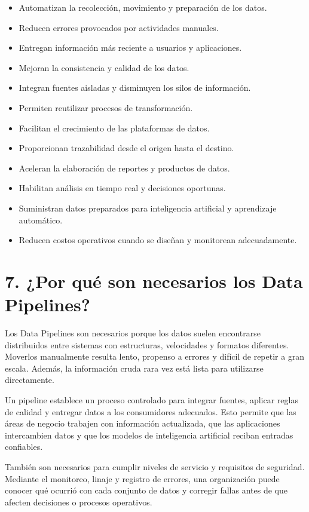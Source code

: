 \begin{itemize}
    \item Automatizan la recolección, movimiento y preparación de los datos.
    \item Reducen errores provocados por actividades manuales.
    \item Entregan información más reciente a usuarios y aplicaciones.
    \item Mejoran la consistencia y calidad de los datos.
    \item Integran fuentes aisladas y disminuyen los silos de información.
    \item Permiten reutilizar procesos de transformación.
    \item Facilitan el crecimiento de las plataformas de datos.
    \item Proporcionan trazabilidad desde el origen hasta el destino.
    \item Aceleran la elaboración de reportes y productos de datos.
    \item Habilitan análisis en tiempo real y decisiones oportunas.
    \item Suministran datos preparados para inteligencia artificial y aprendizaje automático.
    \item Reducen costos operativos cuando se diseñan y monitorean adecuadamente.
\end{itemize}

\section*{7. ¿Por qué son necesarios los Data Pipelines?}

Los Data Pipelines son necesarios porque los datos suelen encontrarse
distribuidos entre sistemas con estructuras, velocidades y formatos diferentes.
Moverlos manualmente resulta lento, propenso a errores y difícil de repetir a
gran escala. Además, la información cruda rara vez está lista para utilizarse
directamente.

Un pipeline establece un proceso controlado para integrar fuentes, aplicar
reglas de calidad y entregar datos a los consumidores adecuados. Esto permite
que las áreas de negocio trabajen con información actualizada, que las
aplicaciones intercambien datos y que los modelos de inteligencia artificial
reciban entradas confiables.

También son necesarios para cumplir niveles de servicio y requisitos de
seguridad. Mediante el monitoreo, linaje y registro de errores, una organización
puede conocer qué ocurrió con cada conjunto de datos y corregir fallas antes de
que afecten decisiones o procesos operativos.

